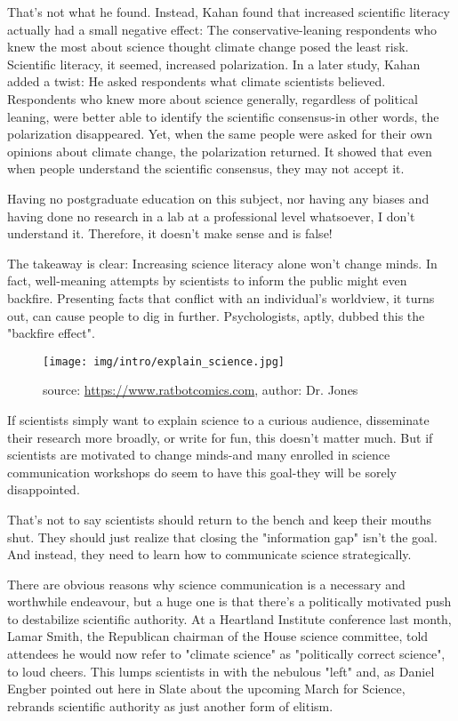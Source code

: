 	That's not what he found. Instead, Kahan found that increased scientific literacy actually had a small negative effect: The conservative-leaning respondents who knew the most about science thought climate change posed the least risk. Scientific literacy, it seemed, increased polarization. In a later study, Kahan added a twist: He asked respondents what climate scientists believed. Respondents who knew more about science generally, regardless of political leaning, were better able to identify the scientific consensus-in other words, the polarization disappeared. Yet, when the same people were asked for their own opinions about climate change, the polarization returned. It showed that even when people understand the scientific consensus, they may not accept it.
	
	\begin{fquote}Having no postgraduate education on this subject, nor having any biases and having done no research in a lab at a professional level whatsoever, I don't understand it. Therefore, it doesn't make sense and is false!
 	\end{fquote}

	The takeaway is clear: Increasing science literacy alone won't change minds. In fact, well-meaning attempts by scientists to inform the public might even backfire. Presenting facts that conflict with an individual's worldview, it turns out, can cause people to dig in further. Psychologists, aptly, dubbed this the "backfire effect".
	\begin{figure}[H]
		\centering
		\texttt{[image: img/intro/explain\_science.jpg]}
		\caption[]{source: \url{https://www.ratbotcomics.com}, author: Dr. Jones}
	\end{figure}
	If scientists simply want to explain science to a curious audience, disseminate their research more broadly, or write for fun, this doesn't matter much. But if scientists are motivated to change minds-and many enrolled in science communication workshops do seem to have this goal-they will be sorely disappointed.

	That's not to say scientists should return to the bench and keep their mouths shut. They should just realize that closing the "information gap" isn't the goal. And instead, they need to learn how to communicate science strategically.

	There are obvious reasons why science communication is a necessary and worthwhile endeavour, but a huge one is that there's a politically motivated push to destabilize scientific authority. At a Heartland Institute conference last month, Lamar Smith, the Republican chairman of the House science committee, told attendees he would now refer to "climate science" as "politically correct science", to loud cheers. This lumps scientists in with the nebulous "left" and, as Daniel Engber pointed out here in Slate about the upcoming March for Science, rebrands scientific authority as just another form of elitism.

